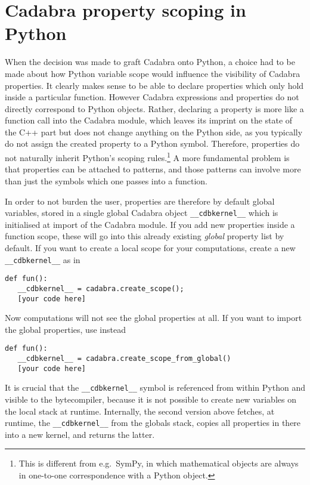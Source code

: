 
\section{Cadabra property scoping in Python}

When the decision was made to graft Cadabra onto Python, a choice had
to be made about how Python variable scope would influence the
visibility of Cadabra properties. It clearly makes sense to be able to
declare properties which only hold inside a particular
function. However Cadabra expressions and properties do not directly
correspond to Python objects. Rather, declaring a property is more
like a function call into the Cadabra module, which leaves its imprint
on the state of the C++ part but does not change anything on the
Python side, as you typically do not assign the created property to a
Python symbol. Therefore, properties do not naturally inherit Python's
scoping rules.\footnote{This is different from e.g.~SymPy, in which
  mathematical objects are always in one-to-one correspondence with a
  Python object.} A more fundamental problem is that properties can be
attached to patterns, and those patterns can involve more than just
the symbols which one passes into a function.

In order to not burden the user, properties are therefore by default
global variables, stored in a single global Cadabra object
\verb|__cdbkernel__| which is initialised at import of the Cadabra module. 
If you add new properties inside a function scope, these will go
into this already existing \emph{global} property list by default.
If you want to create a local scope for your computations, create a
new \verb|__cdbkernel__| as in
\begin{verbatim}
def fun():
   __cdbkernel__ = cadabra.create_scope();
   [your code here]
\end{verbatim}
Now computations will not see the global properties at all. 
If you want to import the global properties, use instead
\begin{verbatim}
def fun():
   __cdbkernel__ = cadabra.create_scope_from_global()
   [your code here]
\end{verbatim}
It is crucial that the
\verb|__cdbkernel__| symbol is referenced from within Python and visible to the bytecompiler, because 
it is not possible to create new variables on the local stack at runtime.
Internally, the second version above fetches, at runtime, the
\verb|__cdbkernel__| from the globals stack, copies all properties in there
into a new kernel, and returns the latter. 

